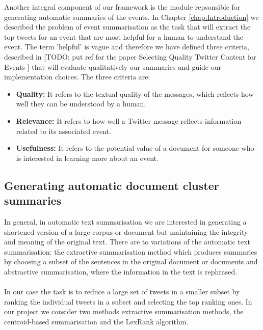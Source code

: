 Another integral component of our framework is the module repsonsible for generating automatic summaries of the events. In Chapter \ref{chap:Introduction}
we described the problem of event summarisation as the task that will extract the top tweets for an event that are most helpful for a human to understand the event.
The term 'helpful' is vague and therefore we have defined three criteria, described in [TODO: put ref for the paper Selecting Quality Twitter Content for Events ] that will evaluate qualitatively our summaries and guide our implementation choices. The three criteria are:

\begin{itemize}
 \item \textbf{Quality:} It refers to the textual quality of the messages, which reflects how well they can be understood by a human.
 \item \textbf{Relevance:} It refers to how well a Twitter message reflects information related to its associated event.
 \item \textbf{Usefulness:} It refers to the potential value of a document for someone who is interested in learning more about an event.
\end{itemize}\vspace{15pt}

\subsection{Generating automatic document cluster summaries}
In general, in automatic text summarisation we are interested in generating a shortened version of a large corpus or document but maintaining the integrity and meaning of 
the original text. There are to variations of the automatic text summarisation: the extractive summarisation method which produces summaries by choosing a subset of the sentences
in the original document or documents and abstractive summarisation, where the information in the text is rephrased.\\\\
In our case the task is to reduce a large set of tweets in a smaller subset by ranking the individual tweets in a subset and selecting the top ranking ones.
In our project we consider two methods extractive summarisation methods, the centroid-based summarisation and the LexRank algorithm.

